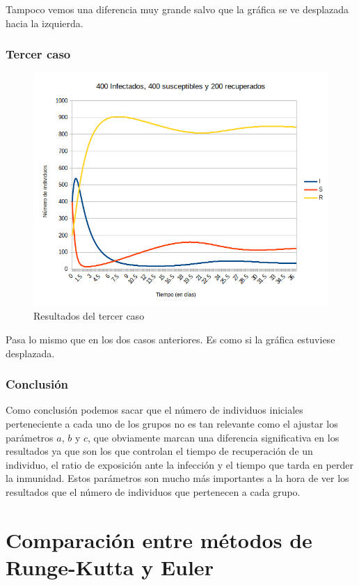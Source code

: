 \documentclass[11pt,a4paper]{report}
\begin{document}
Tampoco vemos una diferencia muy grande salvo que la gráfica se ve desplazada hacia la izquierda.

\newpage
\subsubsection{Tercer caso}

\begin{figure}[H]
\centering
\includegraphics[width=\textwidth]{img/sin_inmunidad/400i_400s_200r.png}
\caption{Resultados del tercer caso}
\label{}
\end{figure}

Pasa lo mismo que en los dos casos anteriores. Es como si la gráfica estuviese desplazada. 

\subsubsection{Conclusión}

Como conclusión podemos sacar que el número de individuos iniciales perteneciente a cada uno de los grupos no es tan relevante como el ajustar los parámetros $a$, $b$ y $c$, que obviamente marcan una diferencia significativa en los resultados ya que son los que controlan el tiempo de recuperación de un individuo, el ratio de exposición ante la infección y el tiempo que tarda en perder la inmunidad. Estos parámetros son mucho más importantes a la hora de ver los resultados que el número de individuos que pertenecen a cada grupo.


\newpage
\section{Comparación entre métodos de Runge-Kutta y Euler}
\end{document}
